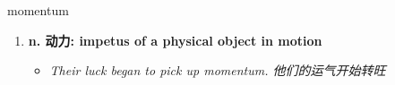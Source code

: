 
\begin{frame}
{\huge momentum}
\begin{center}
\begin{enumerate}\Large
  \item \textbf{n. 动力: impetus of a physical object in motion}
  \begin{itemize}
    \item \em{\Large{Their luck began to pick up momentum. 他们的运气开始转旺}}
  \end{itemize}
\end{enumerate}
\end{center}
\end{frame}
